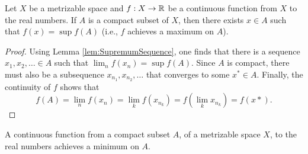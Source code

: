 \begin{theorem}
Let $X$ be a metrizable space and $f: X\rightarrow \mathbb{R}$ be a continuous function from $X$ to the real numbers.
If $A$ is a compact subset of $X$, then there exists $x\in A$ such that $f(x)=\sup f(A)$ (i.e., $f$ achieves a maximum on $A$).
\end{theorem}
\begin{proof}
Using Lemma \ref{lem:SupremumSequence}, one finds that there is a sequence $x_1,x_2,\ldots \in A$ such that $\lim_n f(x_n) = \sup f(A)$.
Since $A$ is compact, there must also be a subsequence $x_{n_1},x_{n_2},\ldots$ that converges to some $x^* \in A$.
Finally, the continuity of $f$ shows that
\[f(A) = \lim_n f(x_n) = \lim_k f(x_{n_k}) = f(\lim_k x_{n_k}) = f(x*).\]
\end{proof}

\begin{corollary}
A continuous function from a compact subset $A$, of a metrizable space $X$, to the real numbers achieves a minimum on $A$.
\end{corollary}


